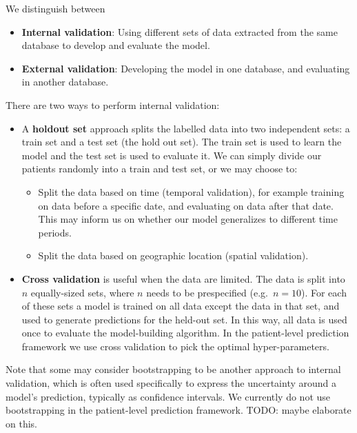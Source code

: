 \documentclass[11pt]{book}
\providecommand{\tightlist}{%
  \setlength{\itemsep}{0pt}\setlength{\parskip}{0pt}}
\theoremstyle{definition}
\theoremstyle{definition}
\theoremstyle{definition}
\theoremstyle{remark}
\begin{document}
We distinguish between

\begin{itemize}
\tightlist
\item
  \textbf{Internal validation}: Using different sets of data extracted from the same database to develop and evaluate the model.
\item
  \textbf{External validation}: Developing the model in one database, and evaluating in another database.
\end{itemize}

There are two ways to perform internal validation:

\begin{itemize}
\tightlist
\item
  A \textbf{holdout set} approach splits the labelled data into two independent sets: a train set and a test set (the hold out set). The train set is used to learn the model and the test set is used to evaluate it. We can simply divide our patients randomly into a train and test set, or we may choose to:

  \begin{itemize}
  \tightlist
  \item
    Split the data based on time (temporal validation), for example training on data before a specific date, and evaluating on data after that date. This may inform us on whether our model generalizes to different time periods.
  \item
    Split the data based on geographic location (spatial validation).
  \end{itemize}
\item
  \textbf{Cross validation} is useful when the data are limited. The data is split into \(n\) equally-sized sets, where \(n\) needs to be prespecified (e.g.~\(n=10\)). For each of these sets a model is trained on all data except the data in that set, and used to generate predictions for the held-out set. In this way, all data is used once to evaluate the model-building algorithm. In the patient-level prediction framework we use cross validation to pick the optimal hyper-parameters.
\end{itemize}

Note that some may consider bootstrapping to be another approach to internal validation, which is often used specifically to express the uncertainty around a model's prediction, typically as confidence intervals. We currently do not use bootstrapping in the patient-level prediction framework. TODO: maybe elaborate on this.
\end{document}
